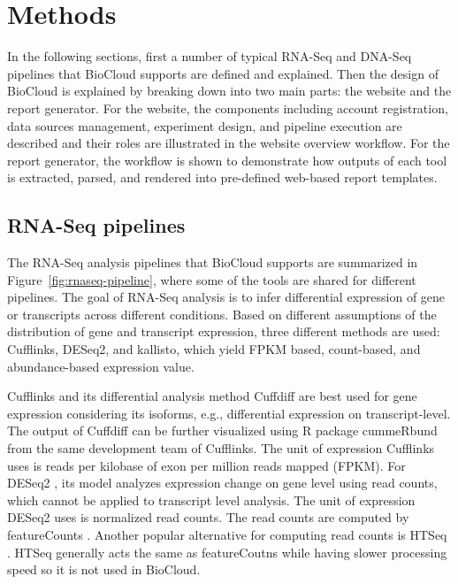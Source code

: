 \chapter{Methods}
\label{c:method}

In the following sections, first a number of typical RNA-Seq and DNA-Seq
pipelines that BioCloud supports are defined and explained. Then the design of
BioCloud is explained by breaking down into two main parts: the website and the
report generator. For the website, the components including account
registration, data sources management, experiment design, and pipeline
execution are described and their roles are illustrated in the website overview
workflow. For the report generator, the workflow is shown to demonstrate how
outputs of each tool is extracted, parsed, and rendered into pre-defined
web-based report templates.



\section{RNA-Seq pipelines}

The RNA-Seq analysis pipelines that BioCloud supports are summarized in
Figure~\ref{fig:rnaseq-pipeline}, where some of the tools are shared for
different pipelines. The goal of RNA-Seq analysis is to infer differential
expression of gene or transcripts across different conditions. Based on
different assumptions of the distribution of gene and transcript expression,
three different methods are used: Cufflinks, DESeq2, and kallisto, which yield
FPKM based, count-based, and abundance-based expression value.



Cufflinks \cite{trapnell2010:transcript} and its differential analysis method
Cuffdiff \cite{trapnell2013:differential} are best used for gene expression
considering its isoforms, e.g., differential expression on transcript-level.
The output of Cuffdiff can be further visualized using R package cummeRbund
\cite{:cummerbund} from the same development team of Cufflinks. The unit of
expression Cufflinks uses is reads per kilobase of exon per million reads
mapped (FPKM). For DESeq2 \cite{love2014:moderated}, its model analyzes
expression change on gene level using read counts, which cannot be applied to
transcript level analysis. The unit of expression DESeq2 uses is normalized
read counts. The read counts are computed by featureCounts
\cite{liao2014:featurecounts}.  Another popular alternative for computing read
counts is HTSeq \cite{anders2015:htseqa}. HTSeq generally acts the same as
featureCoutns while having slower processing speed so it is not used in
BioCloud.

